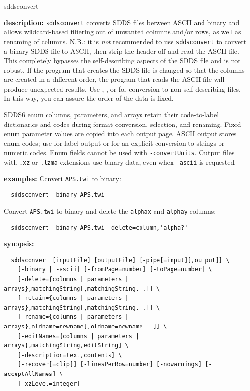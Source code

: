 \begin{sddsprog}{sddsconvert}
  \item \textbf{description:} \verb|sddsconvert| converts SDDS files between ASCII and binary and allows wildcard-based filtering out of unwanted columns and/or rows, as well as renaming of columns. N.B.: it is \emph{not} recommended to use \verb|sddsconvert| to convert a binary SDDS file to ASCII, then strip the header off and read the ASCII file. This completely bypasses the self-describing aspects of the SDDS file and is not robust. If the program that creates the SDDS file is changed so that the columns are created in a different order, the program that reads the ASCII file will produce unexpected results. Use , , or  for conversion to non-self-describing files. In this way, you can assure the order of the data is fixed.

  SDDS6 enum columns, parameters, and arrays retain their code-to-label dictionaries and
  codes during format conversion, selection, and renaming. Fixed enum parameter values
  are copied into each output page. ASCII output stores enum codes; use
   for label output or  for an explicit conversion
  to strings or numeric codes. Enum fields cannot be used with \verb|-convertUnits|.
  Output files with \verb|.xz| or \verb|.lzma| extensions use binary data, even when
  \verb|-ascii| is requested.

  \item \textbf{examples:}
  Convert \verb|APS.twi| to binary:
  \begin{verbatim}
  sddsconvert -binary APS.twi
  \end{verbatim}
  Convert \verb|APS.twi| to binary and delete the \verb|alphax| and \verb|alphay| columns:
  \begin{verbatim}
  sddsconvert -binary APS.twi -delete=column,'alpha?'
  \end{verbatim}

  \item \textbf{synopsis:}
  \begin{verbatim}
  sddsconvert [inputFile] [outputFile] [-pipe[=input][,output]] \
    [-binary | -ascii] [-fromPage=number] [-toPage=number] \
    [-delete={columns | parameters | arrays},matchingString[,matchingString...]] \
    [-retain={columns | parameters | arrays},matchingString[,matchingString...]] \
    [-rename={columns | parameters | arrays},oldname=newname[,oldname=newname...]] \
    [-editNames={columns | parameters | arrays},matchingString,editString] \
    [-description=text,contents] \
    [-recover[=clip]] [-linesPerRow=number] [-nowarnings] [-acceptAllNames] \
    [-xzLevel=integer]
  \end{verbatim}


\end{sddsprog}

